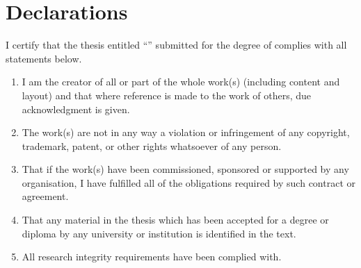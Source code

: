 \newpage
\chapter*{Declarations}

I certify that the thesis entitled ``\thetitle{}'' submitted for the degree of \thedegree{} complies with all statements below.

\begin{enumerate}[label=\roman*)]
  \item I am the creator of all or part of the whole work(s) (including content and layout) and that where reference is made to the work of others, due acknowledgment is given.    
  \item The work(s) are not in any way a violation or infringement of any copyright, trademark, patent, or other rights whatsoever of any person.
  \item That if the work(s) have been commissioned, sponsored or supported by any organisation, I have fulfilled all of the obligations required by such contract or agreement.
  \item That any material in the thesis which has been accepted for a degree or diploma by any university or institution is identified in the text.
  \item All research integrity requirements have been complied with.
\end{enumerate}

\vspace{2cm}

\noindent
\hspace{\fill}
\parbox[b]{0.4\linewidth}{
  \hrulefill\\
  \raggedleft
  \theauthor{}\\
  \footnotesize
  \theauthorspostnominals{}\\
  \thedate{}
}